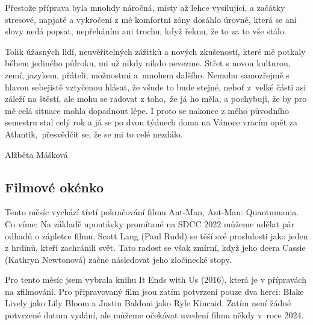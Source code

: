 \documentclass[12pt, a4paper]{article}
\begin{document}
\begin{multicols*}{2}
        Přestože příprava byla mnohdy náročná, místy až lehce vysilující, a začátky stresové, napjaté a vykročení z mé komfortní zóny dosáhlo úrovně, která se ani slovy nedá popsat, nepřeháním ani trochu, když řeknu, že to za to vše stálo.

        Tolik úžasných lidí, neuvěřitelných zážitků a nových zkušeností, které mě potkaly během jediného půlroku, mi už nikdy nikdo nevezme. Střet s novou kulturou, zemí, jazykem, přáteli, možnostmi a~mnohem dalšího. Nemohu samozřejmě s hlavou sebejistě vztyčenou hlásat, že všude to bude stejné, neboť z~velké části asi záleží na štěstí, ale mohu se radovat z toho,~že já ho měla, a pochybuji, že by pro mě celá situace mohla dopadnout lépe. I proto se nakonec z mého původního semestru stal celý rok a já se po dvou týdnech doma na Vánoce vracím opět za Atlantik,~přesvědčit se, že se mi to celé nezdálo.

        \begin{flushright}
			\footnotesize 
            Alžběta Mášková 
		\end{flushright}

        \begin{center}\section*{Filmové okénko}\end{center}

        Tento měsíc vychází třetí pokračování filmu Ant-Man, Ant-Man: Quantumania.
        Co víme: Na základě upoutávky promítané na SDCC 2022 můžeme udělat pár odhadů o zápletce filmu. Scott Lang (Paul Rudd) se těší své proslulosti jako jeden z hrdinů, kteří zachránili svět. Tato radost se však zmírní, když jeho dcera Cassie (Kathryn Newtonová) začne následovat jeho zločinecké stopy.
            
        Pro tento měsíc jsem vybrala knihu It Ends with Us (2016), která je v přípravách na zfilmování. Pro připravovaný film jsou zatím potvrzeni pouze dva herci: Blake Lively jako Lily Bloom a Justin Baldoni jako Ryle Kincaid. Zatím není žádné potvrzené datum vydání, ale můžeme očekávat uvedení filmu někdy v~roce 2024.


\end{multicols*}
\end{document}
